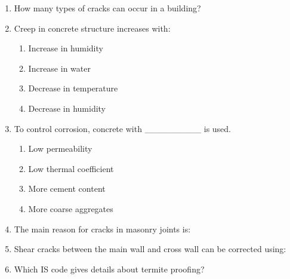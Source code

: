 \documentclass[11pt,a4paper]{article}
\begin{document}
\begin{enumerate}
\item{How many types of cracks can occur in a building?}
\\
\item{Creep in concrete structure increases with:}
\begin{enumerate}[label=\Alph*.]
\item{Increase in humidity}
\item{Increase in water}
\item{Decrease in temperature}
\item{Decrease in humidity}
\end{enumerate}
\item{ To control corrosion, concrete with \_\_\_\_\_\_\_\_\_ is used.}
\begin{enumerate}[label=\Alph*.]
\item{Low permeability}
\item{Low thermal coefficient}
\item{More cement content}
\item{More coarse aggregates}
\end{enumerate}
\item{The main reason for cracks in masonry joints is:}
\\
\item{Shear cracks between the main wall and cross wall can be corrected using:}
\\
\item{Which IS code gives details about termite proofing?}

\end{enumerate}
\end{document}
